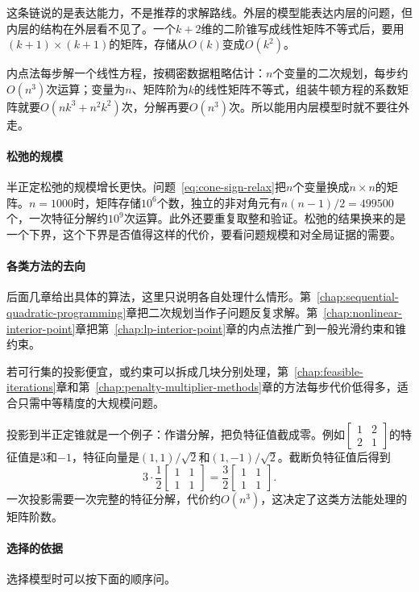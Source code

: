 这条链说的是表达能力，不是推荐的求解路线。外层的模型能表达内层的问题，但内层的结构在外层看不见了。一个$k+2$维的二阶锥写成线性矩阵不等式后，要用$(k+1)\times(k+1)$的矩阵，存储从$O(k)$变成$O(k^2)$。

内点法每步解一个线性方程，按稠密数据粗略估计：$n$个变量的二次规划，每步约$O(n^3)$次运算；变量为$n$、矩阵阶为$k$的线性矩阵不等式，组装牛顿方程的系数矩阵就要$O(nk^3+n^2k^2)$次，分解再要$O(n^3)$次。所以能用内层模型时就不要往外走。

\paragraph{松弛的规模}
半正定松弛的规模增长更快。问题~\eqref{eq:cone-sign-relax}把$n$个变量换成$n\times n$的矩阵。$n=1000$时，矩阵存储$10^6$个数，独立的非对角元有$n(n-1)/2=499500$个，一次特征分解约$10^9$次运算。此外还要重复取整和验证。松弛的结果换来的是一个下界，这个下界是否值得这样的代价，要看问题规模和对全局证据的需要。

\paragraph{各类方法的去向}
后面几章给出具体的算法，这里只说明各自处理什么情形。第~\ref{chap:sequential-quadratic-programming}章把二次规划当作子问题反复求解。第~\ref{chap:nonlinear-interior-point}章把第~\ref{chap:lp-interior-point}章的内点法推广到一般光滑约束和锥约束。

若可行集的投影便宜，或约束可以拆成几块分别处理，第~\ref{chap:feasible-iterations}章和第~\ref{chap:penalty-multiplier-methods}章的方法每步代价低得多，适合只需中等精度的大规模问题。

投影到半正定锥就是一个例子：作谱分解，把负特征值截成零。例如$\begin{bmatrix}1&2\\2&1\end{bmatrix}$的特征值是$3$和$-1$，特征向量是$(1,1)/\sqrt2$和$(1,-1)/\sqrt2$。截断负特征值后得到
\[
 3\cdot\frac12\begin{bmatrix}1&1\\1&1\end{bmatrix}=\frac32\begin{bmatrix}1&1\\1&1\end{bmatrix}.
\]
一次投影需要一次完整的特征分解，代价约$O(n^3)$，这决定了这类方法能处理的矩阵阶数。

\paragraph{选择的依据}
选择模型时可以按下面的顺序问。

